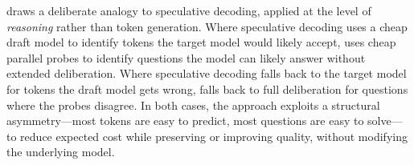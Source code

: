 \method{} draws a deliberate analogy to speculative decoding, applied at the level of \emph{reasoning} rather than token generation.
Where speculative decoding uses a cheap draft model to identify tokens the target model would likely accept, \method{} uses cheap parallel probes to identify questions the model can likely answer without extended deliberation.
Where speculative decoding falls back to the target model for tokens the draft model gets wrong, \method{} falls back to full deliberation for questions where the probes disagree.
In both cases, the approach exploits a structural asymmetry---most tokens are easy to predict, most questions are easy to solve---to reduce expected cost while preserving or improving quality, without modifying the underlying model.
